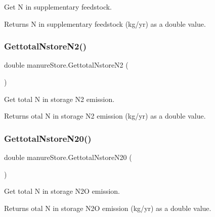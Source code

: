 Get N in supplementary feedstock. 

\begin{DoxyReturn}{Returns}
N in supplementary feedstock (kg/yr) as a double value. 
\end{DoxyReturn}
\mbox{\label{classmanure_store_ae7bc563816e8632a495a39eaca93735f}} 
\subsubsection{\texorpdfstring{GettotalNstoreN2()}{GettotalNstoreN2()}}
{\footnotesize\ttfamily double manure\+Store.\+Gettotal\+Nstore\+N2 (\begin{DoxyParamCaption}{ }\end{DoxyParamCaption})\hspace{0.3cm}{\ttfamily [inline]}}



Get total N in storage N2 emission. 

\begin{DoxyReturn}{Returns}
otal N in storage N2 emission (kg/yr) as a double value. 
\end{DoxyReturn}
\mbox{\label{classmanure_store_a60fd8ec9acb19e7139b9ad47fd5cc351}} 
\subsubsection{\texorpdfstring{GettotalNstoreN20()}{GettotalNstoreN20()}}
{\footnotesize\ttfamily double manure\+Store.\+Gettotal\+Nstore\+N20 (\begin{DoxyParamCaption}{ }\end{DoxyParamCaption})\hspace{0.3cm}{\ttfamily [inline]}}



Get total N in storage N2O emission. 

\begin{DoxyReturn}{Returns}
otal N in storage N2O emission (kg/yr) as a double value. 
\end{DoxyReturn}
\mbox{\label{classmanure_store_a9ed01f678a77c1eb6223a345cd03d692}} 
